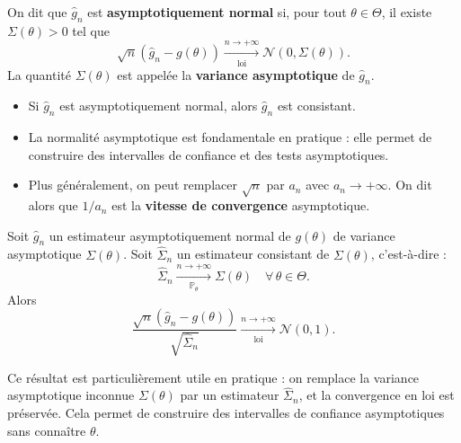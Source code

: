 \smallskip

\begin{mdframed}
\begin{definition}
On dit que $\hat{g}_n$ est \textbf{asymptotiquement normal} si, pour tout $\theta \in \Theta$, il existe $\Sigma(\theta) > 0$ tel que
\[
\sqrt{n}\left(\hat{g}_n - g(\theta)\right) \xrightarrow[\text{loi}]{n \to +\infty} \mathcal{N}(0, \Sigma(\theta)).
\]
La quantité $\Sigma(\theta)$ est appelée la \textbf{variance asymptotique} de $\hat{g}_n$.
\end{definition}
\end{mdframed}

\begin{remarque}
\begin{itemize}
    \item Si $\hat{g}_n$ est asymptotiquement normal, alors $\hat{g}_n$ est consistant.
    \item La normalité asymptotique est fondamentale en pratique : elle permet de construire des intervalles de confiance et des tests asymptotiques.
    \item Plus généralement, on peut remplacer $\sqrt{n}$ par $a_n$ avec $a_n \to +\infty$. On dit alors que $1/a_n$ est la \textbf{vitesse de convergence} asymptotique.
\end{itemize}
\end{remarque}

\smallskip

\begin{mdframed}
\begin{proposition}
Soit $\hat{g}_n$ un estimateur asymptotiquement normal de $g(\theta)$ de variance asymptotique $\Sigma(\theta)$.
Soit $\hat{\Sigma}_n$ un estimateur consistant de $\Sigma(\theta)$, c'est-à-dire :
\[
\hat{\Sigma}_n \xrightarrow[\mathbb{P}_\theta]{n \to +\infty} \Sigma(\theta) \quad \forall\, \theta \in \Theta.
\]
Alors
\[
\frac{\sqrt{n}\left(\hat{g}_n - g(\theta)\right)}{\sqrt{\hat{\Sigma}_n}} \xrightarrow[\text{loi}]{n \to +\infty} \mathcal{N}(0, 1).
\]
\end{proposition}
\end{mdframed}

\begin{remarque}
Ce résultat est particulièrement utile en pratique : on remplace la variance asymptotique inconnue $\Sigma(\theta)$ par un estimateur $\hat{\Sigma}_n$, et la convergence en loi est préservée. Cela permet de construire des intervalles de confiance asymptotiques sans connaître $\theta$.
\end{remarque}

